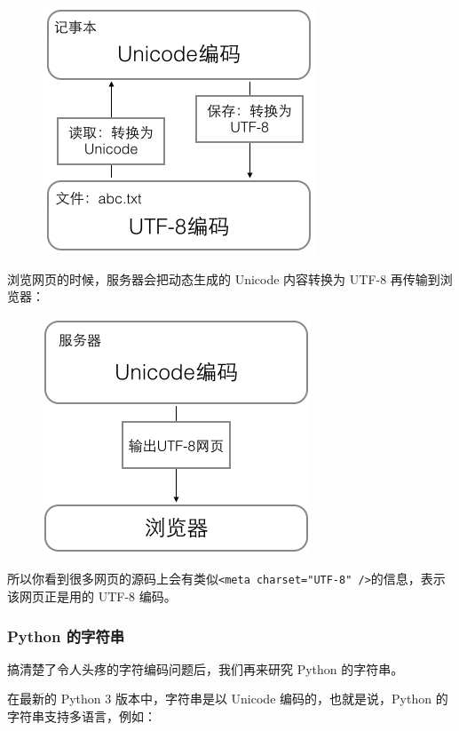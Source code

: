  
 \begin{figure}[htp]
	\centering
	\includegraphics[width=0.6\linewidth]{fig/9239237870188160.png}
\end{figure}


浏览网页的时候，服务器会把动态生成的 Unicode 内容转换为 UTF-8
再传输到浏览器：

 
 \begin{figure}[htp]
	\centering
	\includegraphics[width=0.6\linewidth]{fig/9239237591896000.png}
\end{figure}


所以你看到很多网页的源码上会有类似\texttt{\textless{}meta\ charset="UTF-8"\ /\textgreater{}}的信息，表示该网页正是用的
UTF-8 编码。

\hypertarget{python-ux7684ux5b57ux7b26ux4e32}{%
\subsubsection{Python 的字符串}\label{python-ux7684ux5b57ux7b26ux4e32}}

搞清楚了令人头疼的字符编码问题后，我们再来研究 Python 的字符串。

在最新的 Python 3 版本中，字符串是以 Unicode 编码的，也就是说，Python
的字符串支持多语言，例如：

